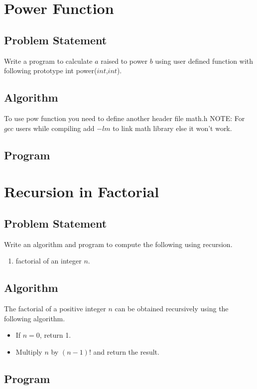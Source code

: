 \documentclass[11pt]{report}
\begin{document}
\chapter{Power Function}
\section{Problem Statement}
Write a program to calculate $a$ raised to power $b$ using user defined function with following prototype int power($int$,$int$).
\section{Algorithm}
To use pow function you need to define another header file math.h
NOTE: For $gcc$ users while compiling add $-lm$ to link math library else it won't work.
\section{Program}
		
		

\chapter{Recursion in Factorial}
\section{Problem Statement}
Write an algorithm and program to compute the following using recursion.
\begin{enumerate}
  \item factorial of an integer $n$.
\end{enumerate}
\section{Algorithm}
The factorial of a positive integer $n$ can be obtained recursively using the following algorithm.
\begin{itemize}
\item If $n=0$, return 1.
\item Multiply $n$ by $(n-1)!$ and return the result. 
\end{itemize}

\section{Program}
        
\end{document}
